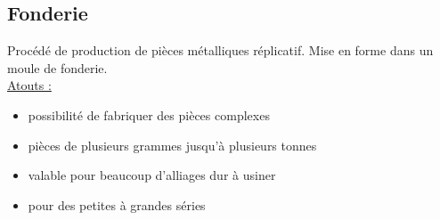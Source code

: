 \documentclass[../main.tex]{subfiles}
\begin{document}
\subsection{Fonderie}
Procédé de production de pièces métalliques réplicatif. Mise en forme dans un moule de fonderie.\\

\underline{Atouts :} \begin{itemize}
    \item possibilité de fabriquer des pièces complexes\\
    \item pièces de plusieurs grammes jusqu'à plusieurs tonnes\\
    \item valable pour beaucoup d'alliages dur à usiner\\
    \item pour des petites à grandes séries\\
\end{itemize}
\end{document}
